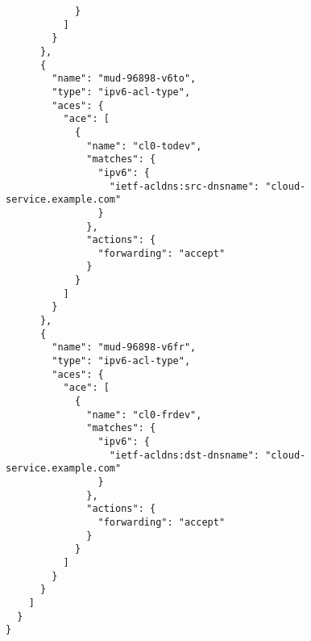 \begin{verbatim}
            }
          ]
        }
      },
      {
        "name": "mud-96898-v6to",
        "type": "ipv6-acl-type",
        "aces": {
          "ace": [
            {
              "name": "cl0-todev",
              "matches": {
                "ipv6": {
                  "ietf-acldns:src-dnsname": "cloud-service.example.com"
                }
              },
              "actions": {
                "forwarding": "accept"
              }
            }
          ]
        }
      },
      {
        "name": "mud-96898-v6fr",
        "type": "ipv6-acl-type",
        "aces": {
          "ace": [
            {
              "name": "cl0-frdev",
              "matches": {
                "ipv6": {
                  "ietf-acldns:dst-dnsname": "cloud-service.example.com"
                }
              },
              "actions": {
                "forwarding": "accept"
              }
            }
          ]
        }
      }
    ]
  }
}
\end{verbatim}
\label{code:mud}
